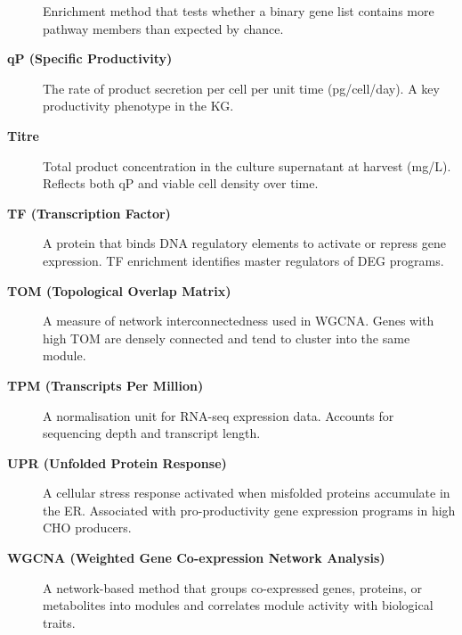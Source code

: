 \documentclass[
  letterpaper,
  oneside,
  open=any]{scrbook}
\begin{document}
\begin{description}
Enrichment method that tests whether a binary gene list contains more
pathway members than expected by chance.
\item[\textbf{qP (Specific Productivity)}]
The rate of product secretion per cell per unit time (pg/cell/day). A
key productivity phenotype in the KG.
\item[\textbf{Titre}]
Total product concentration in the culture supernatant at harvest
(mg/L). Reflects both qP and viable cell density over time.
\item[\textbf{TF (Transcription Factor)}]
A protein that binds DNA regulatory elements to activate or repress gene
expression. TF enrichment identifies master regulators of DEG programs.
\item[\textbf{TOM (Topological Overlap Matrix)}]
A measure of network interconnectedness used in WGCNA. Genes with high
TOM are densely connected and tend to cluster into the same module.
\item[\textbf{TPM (Transcripts Per Million)}]
A normalisation unit for RNA-seq expression data. Accounts for
sequencing depth and transcript length.
\item[\textbf{UPR (Unfolded Protein Response)}]
A cellular stress response activated when misfolded proteins accumulate
in the ER. Associated with pro-productivity gene expression programs in
high CHO producers.
\item[\textbf{WGCNA (Weighted Gene Co-expression Network Analysis)}]
A network-based method that groups co-expressed genes, proteins, or
metabolites into modules and correlates module activity with biological
traits.
\end{description}


\backmatter
\end{document}
